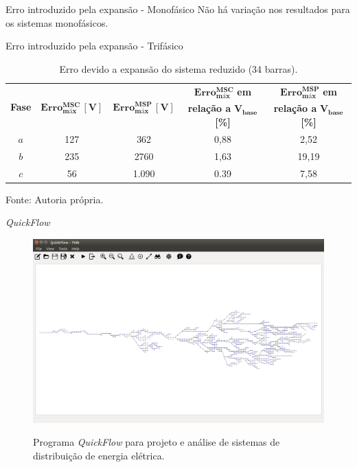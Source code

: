 \documentclass[10pt]{beamer}
\begin{document}
\begin{frame}{Erro introduzido pela expansão - Monofásico}
  Não há variação nos resultados para os sistemas monofásicos.
\end{frame}

\begin{frame}{Erro introduzido pela expansão - Trifásico}
  \small
\begin{table}[h]
  \centering
  \caption{Erro devido a expansão do sistema reduzido (34 barras).}
  \begin{tabular}{ccccc}
    \toprule
    \multirow{2}{*}{\textbf{Fase}} & \multirow{2}{*}{$ \mathbf{Erro_{máx}^{MSC}\,[V]} $} & \multirow{2}{*}{$ \mathbf{Erro_{máx}^{MSP}\,[V]} $} & $ \mathbf{Erro_{máx}^{MSC}} $ \textbf{em} & $ \mathbf{Erro_{máx}^{MSP}} $ \textbf{em}\\
    &&& \textbf{relação a} $\mathbf{V_{base}}$ \textbf{[\%]}& \textbf{relação a} $\mathbf{V_{base}}$ \textbf{[\%]}\\
    \midrule
    $a$		& 127 & 362  & 0,88 & 2,52 \\
    $b$		& 235 & 2760 & 1,63 & 19,19 \\
    $c$		& 56  & 1.090& 0.39 & 7,58 \\
    \bottomrule
  \end{tabular}
  \label{tab:erro}
  
  \small Fonte: Autoria própria.
\end{table}
\normalsize
\end{frame}

\begin{frame}{\textit{QuickFlow}}
    \begin{figure}[H]
        \centering
        \caption{Programa \textit{QuickFlow} para projeto e análise de sistemas de distribuição de energia elétrica.}
        \includegraphics[scale=0.22]{img/quickflow}
        \label{fig:quickflow}
    \end{figure}
\end{frame}
\end{document}
